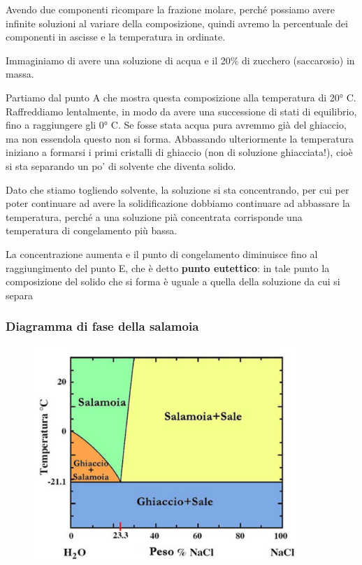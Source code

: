 Avendo due componenti ricompare la frazione molare, perché possiamo avere infinite soluzioni al variare della composizione, quindi avremo la percentuale dei componenti in ascisse e la temperatura in ordinate.

Immaginiamo di avere una soluzione di acqua e il 20\% di zucchero (saccarosio) in massa.

Partiamo dal punto A che mostra questa composizione alla temperatura di 20° C. Raffreddiamo lentalmente, in modo da avere una successione di stati di equilibrio, fino a raggiungere gli 0° C. Se fosse stata acqua pura avremmo già del ghiaccio, ma non essendola questo non si forma. Abbassando ulteriormente la temperatura iniziano a formarsi i primi cristalli di ghiaccio (non di soluzione ghiacciata!), cioè si sta separando un po' di solvente che diventa solido.

Dato che stiamo togliendo solvente, la soluzione si sta concentrando, per cui per poter continuare ad avere la solidificazione dobbiamo continuare ad abbassare la temperatura, perché a una soluzione pià concentrata corrisponde una temperatura di congelamento più bassa.

La concentrazione aumenta e il punto di congelamento diminuisce fino al raggiungimento del punto E, che è detto \textbf{punto eutettico}: in tale punto la composizione del solido che si forma è uguale a quella della soluzione da cui si separa
\subsubsection{Diagramma di fase della salamoia}

\begin{figure}[htp]
    \centering
    \includegraphics[width=10cm]{immagini/diagramma_di_stato_salamoia.png}
\end{figure}